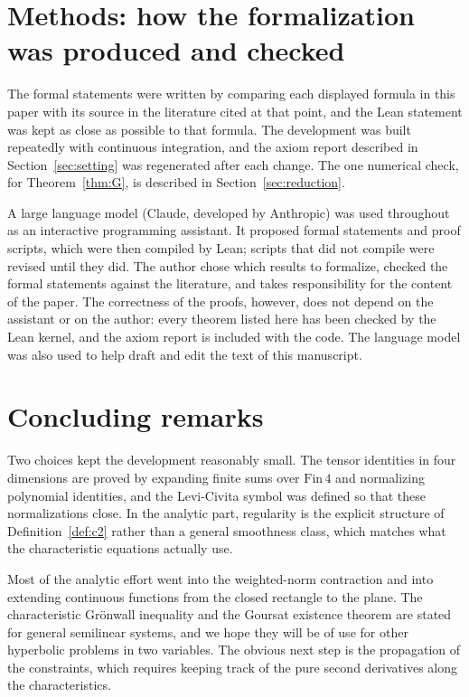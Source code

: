 \documentclass[pdflatex,sn-mathphys-num]{sn-jnl}%
\theoremstyle{thmstyleone}%
\theoremstyle{thmstyletwo}%
\theoremstyle{thmstylethree}%
\begin{document}
\section{Methods: how the formalization was produced and checked}\label{sec:methods}

The formal statements were written by comparing each displayed formula in this paper with its source in the literature cited at that point, and the Lean statement was kept as close as possible to that formula. The development was built repeatedly with continuous integration, and the axiom report described in Section~\ref{sec:setting} was regenerated after each change. The one numerical check, for Theorem~\ref{thm:G}, is described in Section~\ref{sec:reduction}.

A large language model (Claude, developed by Anthropic) was used throughout as an interactive programming assistant. It proposed formal statements and proof scripts, which were then compiled by Lean; scripts that did not compile were revised until they did. The author chose which results to formalize, checked the formal statements against the literature, and takes responsibility for the content of the paper. The correctness of the proofs, however, does not depend on the assistant or on the author: every theorem listed here has been checked by the Lean kernel, and the axiom report is included with the code. The language model was also used to help draft and edit the text of this manuscript.

\section{Concluding remarks}\label{sec:conclusion}

Two choices kept the development reasonably small. The tensor identities in four dimensions are proved by expanding finite sums over $\mathrm{Fin}\,4$ and normalizing polynomial identities, and the Levi-Civita symbol was defined so that these normalizations close. In the analytic part, regularity is the explicit structure of Definition~\ref{def:c2} rather than a general smoothness class, which matches what the characteristic equations actually use.

Most of the analytic effort went into the weighted-norm contraction and into extending continuous functions from the closed rectangle to the plane. The characteristic Gr\"onwall inequality and the Goursat existence theorem are stated for general semilinear systems, and we hope they will be of use for other hyperbolic problems in two variables. The obvious next step is the propagation of the constraints, which requires keeping track of the pure second derivatives along the characteristics.
\end{document}
